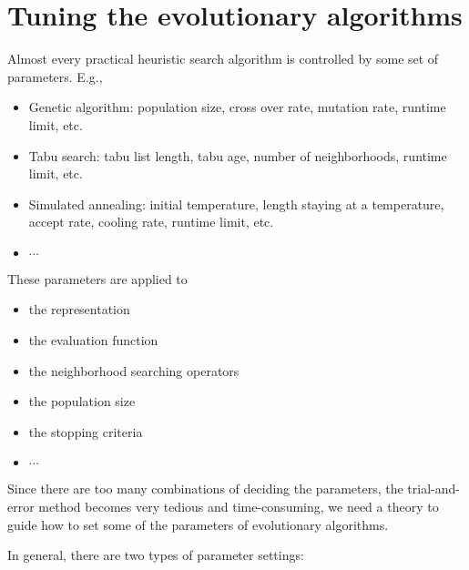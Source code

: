        \section{Tuning the evolutionary algorithms}
            Almost every practical heuristic search algorithm is controlled by some set of parameters. E.g.,

            \begin{itemize}
                \item Genetic algorithm: population size, cross over rate, mutation rate, runtime limit, etc.
                \item Tabu search: tabu list length, tabu age, number of neighborhoods, runtime limit, etc.
                \item Simulated annealing: initial temperature, length staying at a temperature, accept rate, cooling rate, runtime limit, etc.
                \item $\cdots$
            \end{itemize}

            These parameters are applied to

            \begin{itemize}
                \item the representation
                \item the evaluation function
                \item the neighborhood searching operators
                \item the population size
                \item the stopping criteria
                \item $\cdots$
            \end{itemize}

            Since there are too many combinations of deciding the parameters, the trial-and-error method becomes very tedious and time-consuming, we need a theory to guide how to set some of the parameters of evolutionary algorithms.

            In general, there are two types of parameter settings:

